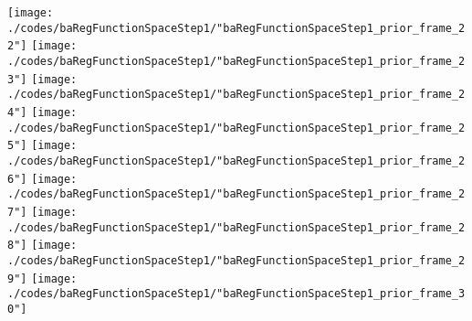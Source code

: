 \begin{frame}{\insertsection}
\begin{center}
{\begin{animateinline}{20}
				 \texttt{[image: ./codes/baRegFunctionSpaceStep1/"baRegFunctionSpaceStep1\_prior\_frame\_22"]}\newframe
				 \texttt{[image: ./codes/baRegFunctionSpaceStep1/"baRegFunctionSpaceStep1\_prior\_frame\_23"]}\newframe
				 \texttt{[image: ./codes/baRegFunctionSpaceStep1/"baRegFunctionSpaceStep1\_prior\_frame\_24"]}\newframe
				 \texttt{[image: ./codes/baRegFunctionSpaceStep1/"baRegFunctionSpaceStep1\_prior\_frame\_25"]}\newframe
				 \texttt{[image: ./codes/baRegFunctionSpaceStep1/"baRegFunctionSpaceStep1\_prior\_frame\_26"]}\newframe
				 \texttt{[image: ./codes/baRegFunctionSpaceStep1/"baRegFunctionSpaceStep1\_prior\_frame\_27"]}\newframe
				 \texttt{[image: ./codes/baRegFunctionSpaceStep1/"baRegFunctionSpaceStep1\_prior\_frame\_28"]}\newframe
				 \texttt{[image: ./codes/baRegFunctionSpaceStep1/"baRegFunctionSpaceStep1\_prior\_frame\_29"]}\newframe
				 \texttt{[image: ./codes/baRegFunctionSpaceStep1/"baRegFunctionSpaceStep1\_prior\_frame\_30"]}
			 \end{animateinline}
			}
	\end{center}
    
\end{frame}

